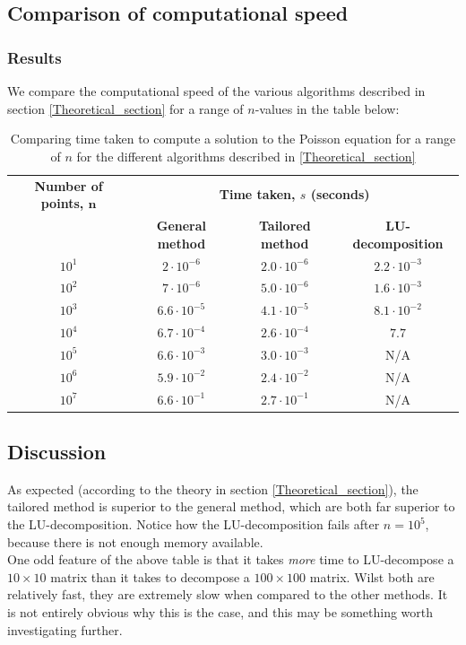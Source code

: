 \documentclass[a4paper, 10pt]{article}
\begin{document}
\subsection{Comparison of computational speed}
\subsubsection{Results}
We compare the computational speed of the various algorithms described in section \ref{Theoretical_section} for a range of $n$-values in the table below:
\begin{table}[h]
\label{table1}
\begin{tabular}{|c|c|c|c|}
\hline
 \multicolumn{1}{|c|}{\textbf{Number of points, $\mathbf{n}$}} & 
  \multicolumn{3}{|c|}{\textbf{Time taken, $s$ (seconds)}} \\
\cline{2-4}
 & \textbf{General method} & \textbf{Tailored method} & \textbf{LU-decomposition} \\
\hline
$10^1$ & $2\cdot 10^{-6}$ & $2.0\cdot 10^{-6}$ & $2.2\cdot 10^{-3}$\\
$10^2$ & $7\cdot 10^{-6}$ & $5.0\cdot 10^{-6}$ & $1.6 \cdot 10^{-3}$\\
$10^3$ & $6.6\cdot 10^{-5}$ & $4.1\cdot 10^{-5}$ & $8.1\cdot 10^{-2}$\\
$10^4$ & $6.7\cdot 10^{-4}$ & $2.6\cdot 10^{-4}$ & $7.7$\\
$10^5$ & $6.6 \cdot 10^{-3}$& $3.0 \cdot 10^{-3}$& N/A\\
$10^6$ & $5.9\cdot 10^{-2}$ & $2.4 \cdot 10^{-2}$& N/A\\
$10^7$ & $6.6 \cdot 10^{-1}$ & $2.7 \cdot 10^{-1}$& N/A\\
\hline
\end{tabular}
\caption{Comparing time taken to compute a solution to the Poisson equation for a range of $n$ for the different algorithms described in \ref{Theoretical_section}}
\end{table}
\subsection{Discussion}
As expected (according to the theory in section \ref{Theoretical_section}), the tailored method is superior to the general method, which are both far superior to the LU-decomposition. Notice how the LU-decomposition fails after $n=10^5$, because there is not enough memory available.\\
\linebreak
One odd feature of the above table is that it takes \textit{more} time to LU-decompose a $10\times 10$ matrix than it takes to decompose a $100 \times 100$ matrix. Wilst both are relatively fast, they are extremely slow when compared to the other methods. It is not entirely obvious why this is the case, and this may be something worth investigating further.
\newpage
\end{document}
